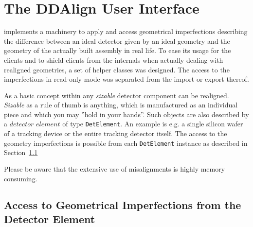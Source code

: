 \documentclass[10pt,a4paper]{article}
\begin{document}
\newpage
\section{The DDAlign User Interface}
\label{sec:ddalign-user-manual-ddalign-interface}

\noindent
\DDA implements a machinery to apply and access geometrical imperfections
describing the difference between an ideal detector given by an ideal geometry
and the geometry of the actually built assembly in real life.
To ease its usage for the clients and to shield clients from the 
internals when actually dealing with realigned geometries, a set of 
helper classes was designed. The access to the imperfections 
in read-only mode was separated from the import or export thereof.

\noindent
As a basic concept within \DDhep any {\it{sizable}} detector component
can be realigned. {\it{Sizable}} as a rule of thumb is anything, which 
is manufactured as an individual piece and which you may ''hold in your hands''.
Such objects are also described by a $detector$ $element$ of type {\tt DetElement}.
An example is e.g. a single silicon wafer of a tracking device or the entire
tracking detector itself.
The access to the geometry imperfections is possible from each {\tt DetElement}
instance as described in Section~\ref{sec:ddalign-user-manual-misalignment-access}

\noindent
Please be aware that the extensive use of misalignments is highly memory
consuming.

\noindent
\subsection{Access to Geometrical Imperfections from the Detector Element}
\label{sec:ddalign-user-manual-misalignment-access}
\end{document}
